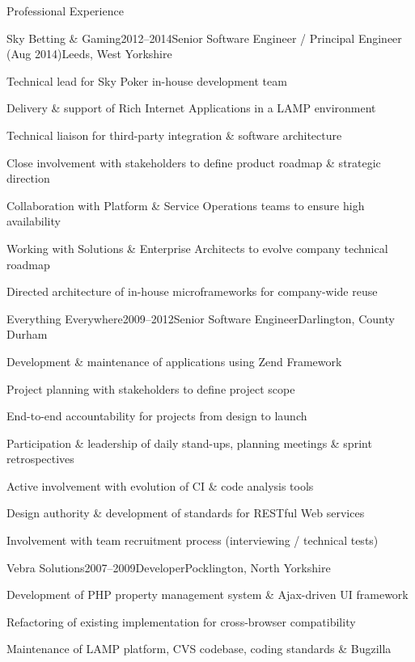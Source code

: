 \documentclass{cv}
\begin{document}
\begin{rSection}{Professional Experience}


\begin{rSubsection}{Sky Betting \& Gaming}{2012--2014}{Senior Software Engineer / Principal Engineer (Aug 2014)}{Leeds, West Yorkshire}
\item Technical lead for Sky Poker in-house development team
\item Delivery \& support of Rich Internet Applications in a LAMP environment
\item Technical liaison for third-party integration \& software architecture
\item Close involvement with stakeholders to define product roadmap \& strategic direction
\item Collaboration with Platform \& Service Operations teams to ensure high availability
\item Working with Solutions \& Enterprise Architects to evolve company technical roadmap
\item Directed architecture of in-house microframeworks for company-wide reuse
\end{rSubsection}


\begin{rSubsection}{Everything Everywhere}{2009--2012}{Senior Software Engineer}{Darlington, County Durham}
\item Development \& maintenance of applications using Zend Framework
\item Project planning with stakeholders to define project scope
\item End-to-end accountability for projects from design to launch
\item Participation \& leadership of daily stand-ups, planning meetings \& sprint retrospectives
\item Active involvement with evolution of CI \& code analysis tools
\item Design authority \& development of standards for RESTful Web services
\item Involvement with team recruitment process (interviewing / technical tests)
\end{rSubsection}


\begin{rSubsection}{Vebra Solutions}{2007--2009}{Developer}{Pocklington, North Yorkshire}
\item Development of PHP property management system \& Ajax-driven UI framework
\item Refactoring of existing implementation for cross-browser compatibility
\item Maintenance of LAMP platform, CVS codebase, coding standards \& Bugzilla
\end{rSubsection}

\end{rSection}
\end{document}
